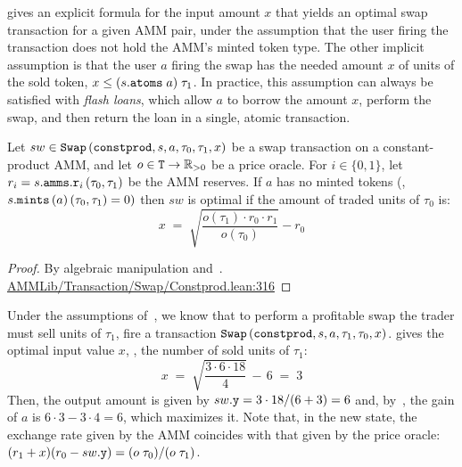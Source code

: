  gives an explicit formula for the input amount $x$ that yields an optimal swap transaction for a given AMM pair, under the assumption that the user firing the transaction does not hold the AMM's minted token type.
The other implicit assumption is that the user $a$ firing the swap has the needed amount $x$ of units of the sold token, \ie $x \leq (s\code{.atoms}\;a)\;\tau_1$. 
In practice, this assumption can always be satisfied with \emph{flash loans}, which allow $a$ to borrow the amount $x$, perform the swap, and then return the loan in a single, atomic transaction.

\begin{theorem}
\label{th:arbitsol}
Let $sw \in \code{Swap}\left(\code{constprod},s,a,\tau_0,\tau_1,x\right)$
be a swap transaction on a constant-product AMM,
and let $o \in \code{T} \to \mathbb R_{>0}$ be a price oracle.
For $i \in \{0,1\}$, let $r_i = s\code{.amms.r}_i\left(\tau_0,\tau_1\right)$ be the AMM reserves. 
If $a$ has no minted tokens (\ie, $s\code{.mints}\left(a\right)\left(\tau_0,\tau_1\right) = 0)$ then $sw$ is optimal if the amount of traded units of $\tau_0$ is:
\[
x \; = \; \sqrt{\frac{o(\tau_1)\cdot r_0 \cdot r_1}{o(\tau_0)}} - r_0
\]
\end{theorem}
\begin{proof}
By algebraic manipulation and~.
\href{https://github.com/danielepusceddu/lean4-amm/blob/paper/AMMLib/Transaction/Swap/Constprod.lean#L316}{AMMLib/Transaction/Swap/Constprod.lean:316}
\end{proof}

\begin{example} 
Under the assumptions of~, we know that to perform a profitable swap the trader must sell units of $\tau_1$, \ie fire a transaction
$\code{Swap}\left(\code{constprod},s,a,\tau_1,\tau_0,x\right)$.
 gives the optimal input value $x$, \ie, the number of sold units of $\tau_1$: 
\[
x \; = \; \sqrt{\frac{3 \cdot 6 \cdot 18}{4}} \, - \, 6 \; = \; 3
\] 
Then, the output amount is given by $sw\code{.y} = 3 \cdot 18/(6+3) = 6$ and, by~, the gain of $a$ is $6 \cdot 3 - 3 \cdot 4 = 6$, which maximizes it. 
Note that, in the new state, the exchange rate given by the AMM coincides with that given by the price oracle: $(r_1 + x)(r_0 - sw\code{.y)} = (o\;\tau_0)/(o\;\tau_1)$.
\end{example}
